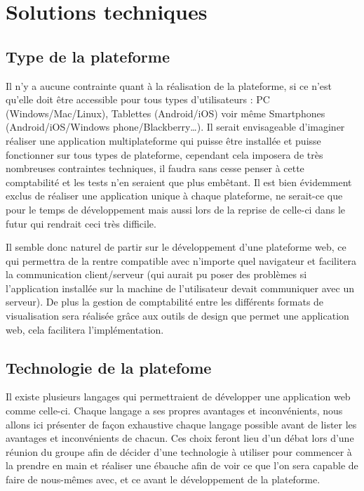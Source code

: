 \section{Solutions techniques}
\label{sec:technique}

    \subsection{Type de la plateforme}
    \label{subsec:plateforme}
    Il n’y a aucune contrainte quant à la réalisation de la plateforme, si ce n’est qu’elle doit être accessible pour tous types d’utilisateurs : PC (Windows/Mac/Linux), Tablettes (Android/iOS) voir même Smartphones (Android/iOS/Windows phone/Blackberry…). Il serait envisageable d’imaginer réaliser une application multiplateforme qui puisse être installée et puisse fonctionner sur tous types de plateforme, cependant cela imposera de très nombreuses contraintes techniques, il faudra sans cesse penser à cette comptabilité et les tests n’en seraient que plus embêtant. Il est bien évidemment exclus de réaliser une application unique à chaque plateforme, ne serait-ce que pour le temps de développement mais aussi lors de la reprise de celle-ci dans le futur qui rendrait ceci très difficile.

    Il semble donc naturel de partir sur le développement d’une plateforme web, ce qui permettra de la rentre compatible avec n’importe quel navigateur et facilitera la communication client/serveur (qui aurait pu poser des problèmes si l’application installée sur la machine de l’utilisateur devait communiquer avec un serveur). De plus la gestion de comptabilité entre les différents formats de visualisation sera réalisée grâce aux outils de design que permet une application web, cela facilitera l’implémentation.

    \subsection{Technologie de la platefome}
    \label{subsec:technologie}
    Il existe plusieurs langages qui permettraient de développer une application web comme celle-ci. Chaque langage a ses propres avantages et inconvénients, nous allons ici présenter de façon exhaustive chaque langage possible avant de lister les avantages et inconvénients de chacun. Ces choix feront lieu d’un débat lors d’une réunion du groupe afin de décider d’une technologie à utiliser pour commencer à la prendre en main et réaliser une ébauche afin de voir ce que l’on sera capable de faire de nous-mêmes avec, et ce avant le développement de la plateforme.


